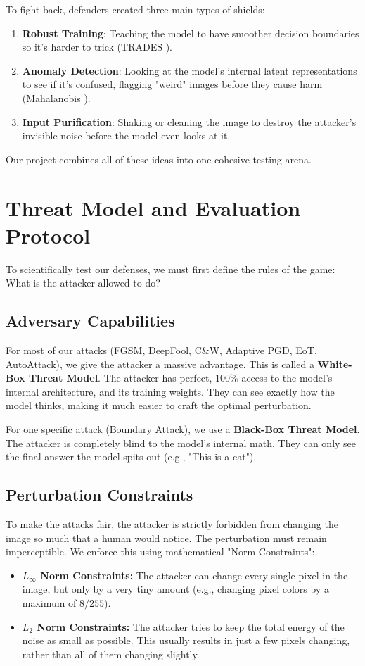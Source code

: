 \documentclass[12pt, a4paper]{article}
\begin{document}
To fight back, defenders created three main types of shields:
\begin{enumerate}
    \item \textbf{Robust Training}: Teaching the model to have smoother decision boundaries so it's harder to trick (TRADES \cite{zhang2019theoretically}).
    \item \textbf{Anomaly Detection}: Looking at the model's internal latent representations to see if it's confused, flagging "weird" images before they cause harm (Mahalanobis \cite{lee2018simple}).
    \item \textbf{Input Purification}: Shaking or cleaning the image to destroy the attacker's invisible noise before the model even looks at it.
\end{enumerate}
Our project combines all of these ideas into one cohesive testing arena.

\newpage
\section{Threat Model and Evaluation Protocol}

To scientifically test our defenses, we must first define the rules of the game: What is the attacker allowed to do?

\subsection{Adversary Capabilities}
For most of our attacks (FGSM, DeepFool, C\&W, Adaptive PGD, EoT, AutoAttack), we give the attacker a massive advantage. This is called a \textbf{White-Box Threat Model}. The attacker has perfect, 100\% access to the model's internal architecture, and its training weights. They can see exactly how the model thinks, making it much easier to craft the optimal perturbation.

For one specific attack (Boundary Attack), we use a \textbf{Black-Box Threat Model}. The attacker is completely blind to the model's internal math. They can only see the final answer the model spits out (e.g., "This is a cat").

\subsection{Perturbation Constraints}
To make the attacks fair, the attacker is strictly forbidden from changing the image so much that a human would notice. The perturbation must remain imperceptible. We enforce this using mathematical "Norm Constraints":
\begin{itemize}
    \item \textbf{$L_\infty$ Norm Constraints:} The attacker can change every single pixel in the image, but only by a very tiny amount (e.g., changing pixel colors by a maximum of $8/255$).
    \item \textbf{$L_2$ Norm Constraints:} The attacker tries to keep the total energy of the noise as small as possible. This usually results in just a few pixels changing, rather than all of them changing slightly.
\end{itemize}
\end{document}
